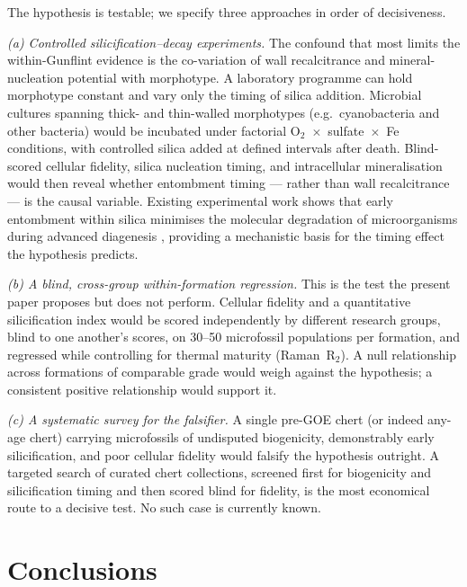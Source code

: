 \documentclass[11pt]{article}
\begin{document}
The hypothesis is testable; we specify three approaches in order of decisiveness.

\textit{(a) Controlled silicification--decay experiments.} The confound that most limits the
within-Gunflint evidence is the co-variation of wall recalcitrance and mineral-nucleation potential
with morphotype. A laboratory programme can hold morphotype constant and vary only the timing of
silica addition. Microbial cultures spanning thick- and thin-walled morphotypes (e.g.\ cyanobacteria
and other bacteria) would be incubated under factorial O$_2$~$\times$~sulfate~$\times$~Fe conditions,
with controlled silica added at defined intervals after death. Blind-scored cellular fidelity, silica
nucleation timing, and intracellular mineralisation would then reveal whether entombment timing ---
rather than wall recalcitrance --- is the causal variable. Existing experimental work shows that
early entombment within silica minimises the molecular degradation of microorganisms during advanced
diagenesis \citep{Alleon2016silica}, providing a mechanistic basis for the timing effect the
hypothesis predicts.

\textit{(b) A blind, cross-group within-formation regression.} This is the test the present paper
proposes but does not perform. Cellular fidelity and a quantitative silicification index would be
scored independently by different research groups, blind to one another's scores, on 30--50
microfossil populations per formation, and regressed while controlling for thermal maturity
(Raman~R$_2$). A null relationship across formations of comparable grade would weigh against the
hypothesis; a consistent positive relationship would support it.

\textit{(c) A systematic survey for the falsifier.} A single pre-GOE chert (or indeed any-age chert)
carrying microfossils of undisputed biogenicity, demonstrably early silicification, and poor cellular
fidelity would falsify the hypothesis outright. A targeted search of curated chert collections,
screened first for biogenicity and silicification timing and then scored blind for fidelity, is the
most economical route to a decisive test. No such case is currently known.

\section{Conclusions}
\end{document}

